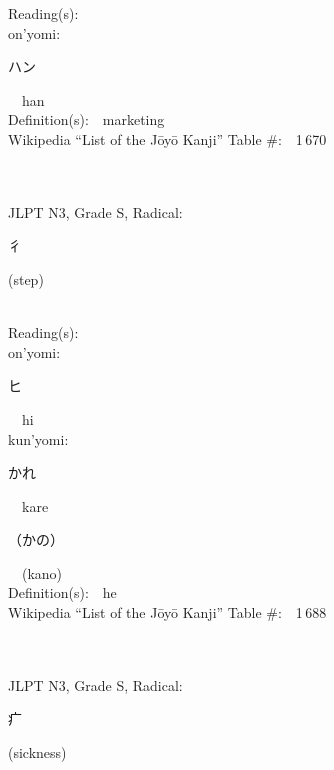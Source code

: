 \begin{multicols}{2}
Reading(s):\ \ \\
{\hspace*{1em}}on'yomi:\ \ \\
{\hspace*{2em}}{\begin{CJK}{UTF8}{min} ハン \end{CJK}}\ \ han\ \ \\
Definition(s):\ \ marketing \\
Wikipedia ``List of the J\=oy\=o Kanji'' Table \#:\ \ 1\,670 \\
\ \ \\
{\fontsize{34pt}{40pt}  }\ \ \\  %
{JLPT N3, Grade S, Radical:\ \ {\begin{CJK}{UTF8}{min} 彳 \end{CJK}} (step) } \\
Reading(s):\ \ \\
{\hspace*{1em}}on'yomi:\ \ \\
{\hspace*{2em}}{\begin{CJK}{UTF8}{min} ヒ \end{CJK}}\ \ hi\ \ \\
{\hspace*{1em}}kun'yomi:\ \ \\
{\hspace*{2em}}{\begin{CJK}{UTF8}{min} かれ \end{CJK}}\ \ kare\ \ \\
{\hspace*{2em}}{\begin{CJK}{UTF8}{min} （かの） \end{CJK}}\ \ (kano)\ \ \\
Definition(s):\ \ he \\
Wikipedia ``List of the J\=oy\=o Kanji'' Table \#:\ \ 1\,688 \\
\ \ \\
{\fontsize{34pt}{40pt}  }\ \ \\  %
{JLPT N3, Grade S, Radical:\ \ {\begin{CJK}{UTF8}{min} 疒 \end{CJK}} (sickness) } \\

\end{multicols}
